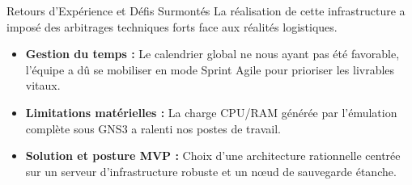 

\begin{frame}{Retours d'Expérience et Défis Surmontés}
    La réalisation de cette infrastructure a imposé des arbitrages techniques forts face aux réalités logistiques.

    \vspace{0.2cm}
    \begin{itemize}
        \item \textbf{Gestion du temps :} Le calendrier global ne nous ayant pas été favorable, l'équipe a dû se mobiliser en mode Sprint Agile pour prioriser les livrables vitaux.
        \item \textbf{Limitations matérielles :} La charge CPU/RAM générée par l'émulation complète sous GNS3 a ralenti nos postes de travail.
        \item \textbf{Solution et posture MVP :} Choix d'une architecture rationnelle centrée sur un serveur d'infrastructure robuste et un nœud de sauvegarde étanche.
    \end{itemize}
\end{frame}

